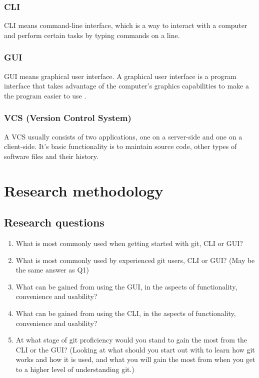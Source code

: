 \documentclass[12pt,a4paper,article,compsoc]{IEEEtran}
\begin{document}
			\subsubsection{CLI}
			CLI means command-line interface, which is a way to interact with a computer and perform certain tasks by typing commands on a line.
			
			\subsubsection{GUI}
			GUI means graphical user interface. A graphical user interface is a program interface that takes advantage of the computer's graphics capabilities to make a the program easier to use \cite{WhatIsGui}.
			
			\subsubsection{VCS (Version Control System)}
			A VCS usually consists of two applications, one on a server-side and one on a client-side.
			It's basic functionality is to maintain source code, other types of software files and their history.\cite{FoundationVCforWebDevs}
			
		\section{Research methodology}
			\subsection{Research questions}
			\begin{enumerate}
				\item What is most commonly used when getting started with git, CLI or GUI?
				\item What is most commonly used by experienced git users, CLI or GUI? (May be the same answer as Q1)
				\item What can be gained from using the GUI, in the aspects of functionality, convenience and usability?
				\item What can be gained from using the CLI, in the aspects of functionality, convenience and usability?
				\item At what stage of git proficiency would you stand to gain the most from the CLI or the GUI? (Looking at what should you start out with to learn how git works and how it is used, and what you will gain the most from when you get to a higher level of understanding git.)
			\end{enumerate}
		
\end{document}
